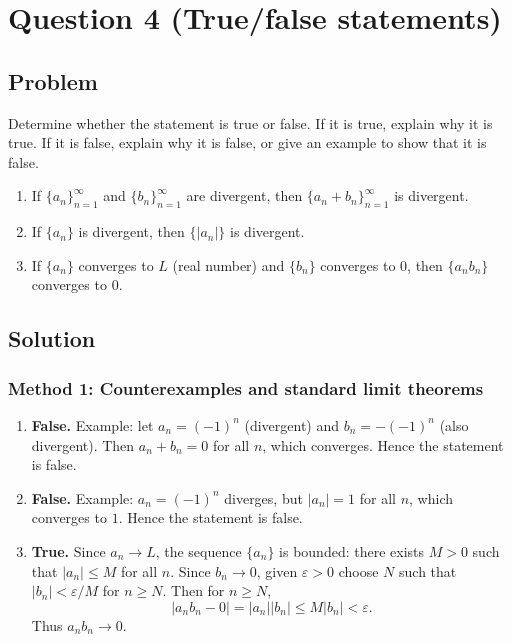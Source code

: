 \documentclass[12pt]{article}
\begin{document}

\section*{Question 4 (True/false statements)}

\subsection*{Problem}
Determine whether the statement is true or false. If it is true, explain why it is true. If it is false, explain why it is false, or give an example to show that it is false.
\begin{enumerate}[label=(\alph*)]
\item If \(\{a_n\}_{n=1}^{\infty}\) and \(\{b_n\}_{n=1}^{\infty}\) are divergent, then \(\{a_n+b_n\}_{n=1}^{\infty}\) is divergent.
\item If \(\{a_n\}\) is divergent, then \(\{|a_n|\}\) is divergent.
\item If \(\{a_n\}\) converges to \(L\) (real number) and \(\{b_n\}\) converges to \(0\), then \(\{a_nb_n\}\) converges to \(0\).
\end{enumerate}

\subsection*{Solution}

\subsubsection*{Method 1: Counterexamples and standard limit theorems}

\begin{enumerate}[label=(\alph*)]
\item \textbf{False.} Example: let \(a_n=(-1)^n\) (divergent) and \(b_n=-(-1)^n\) (also divergent). Then \(a_n+b_n=0\) for all \(n\), which converges. Hence the statement is false.

\item \textbf{False.} Example: \(a_n=(-1)^n\) diverges, but \(|a_n|=1\) for all \(n\), which converges to \(1\). Hence the statement is false.

\item \textbf{True.} Since \(a_n\to L\), the sequence \(\{a_n\}\) is bounded: there exists \(M>0\) such that \(|a_n|\le M\) for all \(n\). Since \(b_n\to 0\), given \(\varepsilon>0\) choose \(N\) such that \(|b_n|<\varepsilon/M\) for \(n\ge N\). Then for \(n\ge N\),
\[
|a_nb_n-0|=|a_n||b_n|\le M|b_n|<\varepsilon.
\]
Thus \(\boxed{a_nb_n\to 0}\).
\end{enumerate}
\end{document}
